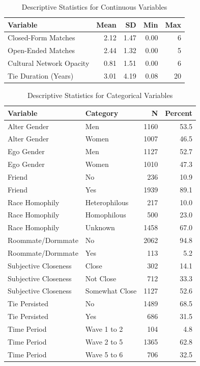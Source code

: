 {

\begin{longtable}[]{@{}lrrrr@{}}

\caption{\label{tbl-descriptives-cont}Descriptive Statistics for
Continuous Variables}

\tabularnewline

\toprule\noalign{}
Variable & Mean & SD & Min & Max \\
\midrule\noalign{}
\endhead
\bottomrule\noalign{}
\endlastfoot
Closed-Form Matches & 2.12 & 1.47 & 0.00 & 6 \\
Open-Ended Matches & 2.44 & 1.32 & 0.00 & 5 \\
Cultural Network Opacity & 0.81 & 1.51 & 0.00 & 6 \\
Tie Duration (Years) & 3.01 & 4.19 & 0.08 & 20 \\

\end{longtable}

}

{

\begin{longtable}[]{@{}llrr@{}}

\caption{\label{tbl-descriptives-cat}Descriptive Statistics for
Categorical Variables}

\tabularnewline

\toprule\noalign{}
Variable & Category & N & Percent \\
\midrule\noalign{}
\endhead
\bottomrule\noalign{}
\endlastfoot
Alter Gender & Men & 1160 & 53.5 \\
Alter Gender & Women & 1007 & 46.5 \\
Ego Gender & Men & 1127 & 52.7 \\
Ego Gender & Women & 1010 & 47.3 \\
Friend & No & 236 & 10.9 \\
Friend & Yes & 1939 & 89.1 \\
Race Homophily & Heterophilous & 217 & 10.0 \\
Race Homophily & Homophilous & 500 & 23.0 \\
Race Homophily & Unknown & 1458 & 67.0 \\
Roommate/Dormmate & No & 2062 & 94.8 \\
Roommate/Dormmate & Yes & 113 & 5.2 \\
Subjective Closeness & Close & 302 & 14.1 \\
Subjective Closeness & Not Close & 712 & 33.3 \\
Subjective Closeness & Somewhat Close & 1127 & 52.6 \\
Tie Persisted & No & 1489 & 68.5 \\
Tie Persisted & Yes & 686 & 31.5 \\
Time Period & Wave 1 to 2 & 104 & 4.8 \\
Time Period & Wave 2 to 5 & 1365 & 62.8 \\
Time Period & Wave 5 to 6 & 706 & 32.5 \\

\end{longtable}

}





